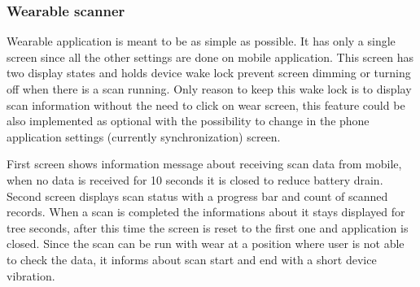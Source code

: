 \subsubsection{Wearable scanner}\label{subsec:WearableScanner}
Wearable application is meant to be as simple as possible. It has only a single screen since all the other settings are done on mobile application. This screen has two display states and holds device wake lock prevent screen dimming or turning off when there is a scan running. Only reason to keep this wake lock is to display scan information without the need to click on wear screen, this feature could be also implemented as optional with the possibility to change in the phone application settings (currently synchronization) screen. 


First screen shows information message about receiving scan data from mobile, when no data is received for 10 seconds it is closed to reduce battery drain. Second screen displays scan status with a progress bar and count of scanned records. When a scan is completed the informations about it stays displayed for tree seconds, after this time the screen is reset to the first one and application is closed. Since the scan can be run with wear at a position where user is not able to check the data, it informs about scan start and end with a short device vibration.